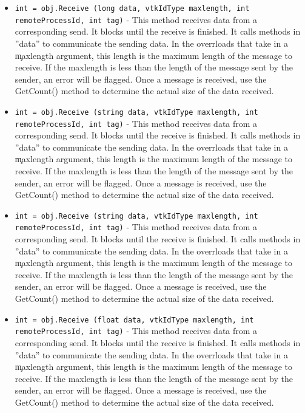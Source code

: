 \begin{itemize}
\item  \verb|int = obj.Receive (long data, vtkIdType maxlength, int remoteProcessId, int tag)| -  This method receives data from a corresponding send. It blocks
 until the receive is finished.  It calls methods in ''data''
 to communicate the sending data. In the overrloads that take in a \c
 maxlength argument, this length is the maximum length of the message to
 receive. If the maxlength is less than the length of the message sent by
 the sender, an error will be flagged. Once a message is received, use the
 GetCount() method to determine the actual size of the data received.

\item  \verb|int = obj.Receive (string data, vtkIdType maxlength, int remoteProcessId, int tag)| -  This method receives data from a corresponding send. It blocks
 until the receive is finished.  It calls methods in ''data''
 to communicate the sending data. In the overrloads that take in a \c
 maxlength argument, this length is the maximum length of the message to
 receive. If the maxlength is less than the length of the message sent by
 the sender, an error will be flagged. Once a message is received, use the
 GetCount() method to determine the actual size of the data received.

\item  \verb|int = obj.Receive (string data, vtkIdType maxlength, int remoteProcessId, int tag)| -  This method receives data from a corresponding send. It blocks
 until the receive is finished.  It calls methods in ''data''
 to communicate the sending data. In the overrloads that take in a \c
 maxlength argument, this length is the maximum length of the message to
 receive. If the maxlength is less than the length of the message sent by
 the sender, an error will be flagged. Once a message is received, use the
 GetCount() method to determine the actual size of the data received.

\item  \verb|int = obj.Receive (float data, vtkIdType maxlength, int remoteProcessId, int tag)| -  This method receives data from a corresponding send. It blocks
 until the receive is finished.  It calls methods in ''data''
 to communicate the sending data. In the overrloads that take in a \c
 maxlength argument, this length is the maximum length of the message to
 receive. If the maxlength is less than the length of the message sent by
 the sender, an error will be flagged. Once a message is received, use the
 GetCount() method to determine the actual size of the data received.


\end{itemize}
